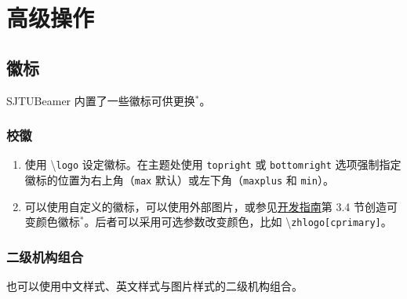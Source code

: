 \documentclass[
    UTF8,
    heading=true,
    12pt,
    a4paper
]{ctexrep}
\newenvironment{commentlist}{\begin{enumerate}\small}{\end{enumerate}}
\newcommand{\cmd}[1]{\textbackslash{}\texttt{#1}}
\newcommand{\opt}[1]{\texttt{#1}}
\def\themename{\textsf{SJTUBeamer}}
\begin{document}
\part{高级操作}
\chapter{徽标}

\themename{} 内置了一些徽标可供更换$^*$。

\section{校徽}

\begin{tcbitemize}[raster rows=2, raster columns=3, raster every box/.style={center title, valign=center, halign=center,fonttitle=\ttfamily,colback=white}]
  \tcbitem[raster multicolumn=2,blankest]
  \begin{tcbitemize}[raster columns=2]
    \tcbitem[title={\cmd{zhlogo}}]
    \hbox{\resizebox{!}{1cm}{\zhlogo}}
    \tcbitem[title={\cmd{enlogo}}]
    \hbox{\resizebox{!}{1cm}{\enlogo}}
    \tcbitem[title={\cmd{sjtubadge}},height=3.5cm]
    \resizebox{!}{2cm}{\sjtubadge{}}
    \tcbitem[title={\cmd{dlogo}},height=3.5cm]
    \resizebox{3cm}{!}{\dlogo{}}
  \end{tcbitemize}
  \tcbitem[title={\cmd{vlogo}}] \resizebox{!}{4.8cm}{\vlogo{}}
\end{tcbitemize}


\begin{commentlist}
  \item 使用 \cmd{logo} 设定徽标。在主题处使用 \opt{topright} 或 \opt{bottomright} 选项强制指定徽标的位置为右上角（\opt{max} 默认）或左下角（\opt{maxplus} 和 \opt{min}）。
  \item 可以使用自定义的徽标，可以使用外部图片，或参见\href{run:sjtubeamerdevguide.pdf}{开发指南}第 3.4 节创造可变颜色徽标$^*$。后者可以采用可选参数改变颜色，比如 \cmd{zhlogo[cprimary]}。
\end{commentlist}

\section{二级机构组合}

也可以使用中文样式、英文样式与图片样式的二级机构组合。
\end{document}
